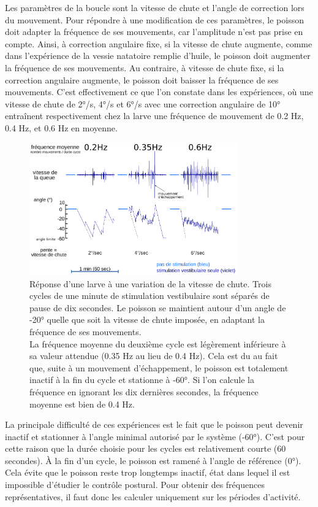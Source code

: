 Les paramètres de la boucle sont la vitesse de chute et l'angle de correction lors du mouvement. Pour répondre à une modification de ces paramètres, le poisson doit adapter la fréquence de ses mouvements, car l'amplitude n'est pas prise en compte. Ainsi, à correction angulaire fixe, si la vitesse de chute augmente, comme dans l'expérience de la vessie natatoire remplie d'huile, le poisson doit augmenter la fréquence de ses mouvements. Au contraire, à vitesse de chute fixe, si la correction angulaire augmente, le poisson doit baisser la fréquence de ses mouvements. C'est effectivement ce que l'on constate dans les expériences, où une vitesse de chute de 2°/s, 4°/s et 6°/s avec une correction angulaire de 10° entraînent respectivement chez la larve une fréquence de mouvement de 0.2 Hz, 0.4 Hz, et 0.6 Hz en moyenne.

\begin{figure}
\centering
\includegraphics[width=0.8\textwidth]{./files/variation-vitesse.svg.png}
\caption{
Réponse d'une larve à une variation de la vitesse de chute. Trois cycles de une minute de stimulation vestibulaire sont séparés de pause de dix secondes. Le poisson se maintient autour d'un angle de -20° quelle que soit la vitesse de chute imposée, en adaptant la fréquence de ses mouvements.
\\
La fréquence moyenne du deuxième cycle est légèrement inférieure à sa valeur attendue (0.35 Hz au lieu de 0.4 Hz). Cela est du au fait que, suite à un mouvement d'échappement, le poisson est totalement inactif à la fin du cycle et stationne à -60°. Si l'on calcule la fréquence en ignorant les dix dernières secondes, la fréquence moyenne est bien de 0.4 Hz.
}
\end{figure}


La principale difficulté de ces expériences est le fait que le poisson peut devenir inactif et stationner à l'angle minimal autorisé par le système (-60°). C'est pour cette raison que la durée choisie pour les cycles est relativement courte (60 secondes). À la fin d'un cycle, le poisson est ramené à l'angle de référence (0°). Cela évite que le poisson reste trop longtemps inactif, état dans lequel il est impossible d'étudier le contrôle postural. Pour obtenir des fréquences représentatives, il faut donc les calculer uniquement sur les périodes d'activité.

